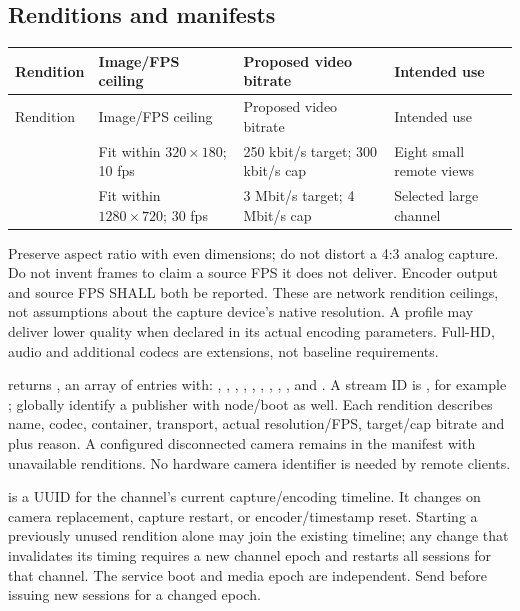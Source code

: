 \subsection{Renditions and manifests}
\begin{longtable}{L{27mm}L{43mm}L{39mm}L{47mm}}
\toprule Rendition & Image/FPS ceiling & Proposed video bitrate & Intended use\\\midrule
\endfirsthead
\toprule Rendition & Image/FPS ceiling & Proposed video bitrate & Intended use\\\midrule
\endhead
{} & Fit within $320\times180$; 10 fps & 250 kbit/s target; 300 kbit/s cap & Eight small remote views\\
 & Fit within $1280\times720$; 30 fps & 3 Mbit/s target; 4 Mbit/s cap & Selected large channel\\
\bottomrule
\end{longtable}

Preserve aspect ratio with even dimensions; do not distort a 4:3 analog capture.
Do not invent frames to claim a source FPS it does not deliver. Encoder output
and source FPS SHALL both be reported. These are network rendition ceilings,
not assumptions about the capture device's native resolution. A profile may
deliver lower quality when declared in its actual encoding parameters. Full-HD,
audio and additional codecs are extensions, not baseline requirements.

 returns , an array of entries with:
, , , ,
, , ,
, , and . A stream ID is
, for example ; globally
identify a publisher with node/boot as well. Each rendition describes name,
codec, container, transport, actual resolution/FPS, target/cap bitrate and
 plus reason. A configured disconnected camera remains in the
manifest with unavailable renditions. No hardware camera identifier is needed
by remote clients.

 is a UUID for the channel's current capture/encoding timeline.
It changes on camera replacement, capture restart, or encoder/timestamp reset.
Starting a previously unused rendition alone may join the existing timeline;
any change that invalidates its timing requires a new channel epoch and restarts
all sessions for that channel. The service boot and media epoch are independent.
Send  before issuing new sessions for a changed epoch.

